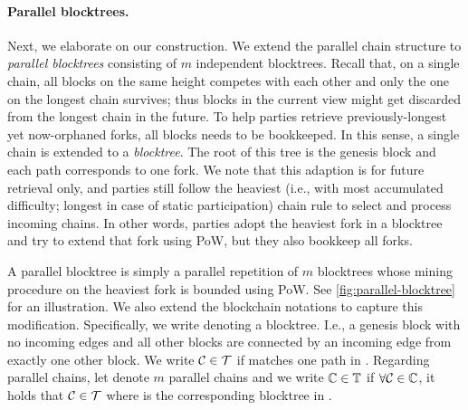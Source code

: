 \paragraph{Parallel blocktrees.}
%
Next, we elaborate on our construction.
%
We extend the parallel chain structure to \emph{parallel blocktrees} consisting of $m$ independent blocktrees.
%
Recall that, on a single chain, all blocks on the same height competes with each other and only the one on the longest chain survives; thus blocks in the current view might get discarded from the longest chain in the future.
%
To help parties retrieve previously-longest yet now-orphaned forks, all blocks needs to be bookkeeped.
%
In this sense, a single chain is extended to a \emph{blocktree}.
%
The root of this tree is the genesis block and each path corresponds to one fork.
%
We note that this adaption is for future retrieval only, and parties still follow the heaviest (i.e., with most accumulated difficulty; longest in case of static participation) chain rule to select and process incoming chains.
%
In other words, parties adopt the heaviest fork in a blocktree and try to extend that fork using PoW, but they also bookkeep all forks.

A parallel blocktree is simply a parallel repetition of $m$ blocktrees whose mining procedure on the heaviest fork is bounded using \mforone PoW.
%
See \cref{fig:parallel-blocktree} for an illustration.
%
We also extend the blockchain notations to capture this modification.
%
Specifically, we write \blockTree denoting a blocktree.
%
I.e., a genesis block with no incoming edges and all other blocks are connected by an incoming edge from exactly one other block.
%
We write $\mathcal{C} \in \mathcal{T}$ if \chain matches one path in \blockTree.
%
Regarding parallel chains, let \parallelTrees denote $m$ parallel chains and we write $\mathbb{C} \in \mathbb{T}$ if $\forall \mathcal{C} \in \mathbb{C}$, it holds that $\mathcal{C} \in \mathcal{T}$ where \blockTree is the corresponding blocktree in \parallelTrees.



